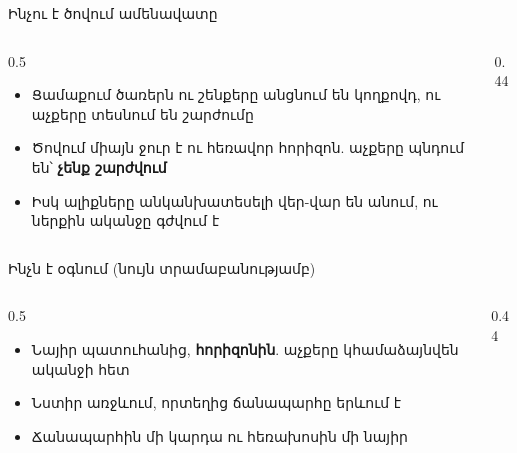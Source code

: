 \begin{frame}{Ինչու է ծովում ամենավատը}
  \begin{columns}[T]
    \begin{column}{0.5\textwidth}
      \begin{itemize}
        \item Ցամաքում ծառերն ու շենքերը անցնում են կողքովդ, ու աչքերը տեսնում են շարժումը
        \item Ծովում միայն ջուր է ու հեռավոր հորիզոն. աչքերը պնդում են՝ \textbf{չենք շարժվում}
        \item Իսկ ալիքները անկանխատեսելի վեր-վար են անում, ու ներքին ականջը գժվում է
      \end{itemize}
    \end{column}
    \begin{column}{0.44\textwidth}
    \end{column}
  \end{columns}
\end{frame}

\begin{frame}{Ինչն է օգնում (նույն տրամաբանությամբ)}
  \begin{columns}[T]
    \begin{column}{0.5\textwidth}
      \begin{card}[colback=mint!35!cardwhite]
        \begin{itemize}
          \item Նայիր պատուհանից, \textbf{հորիզոնին}. աչքերը կհամաձայնվեն ականջի հետ
          \item Նստիր առջևում, որտեղից ճանապարհը երևում է
          \item Ճանապարհին մի կարդա ու հեռախոսին մի նայիր
        \end{itemize}
      \end{card}
    \end{column}
    \begin{column}{0.44\textwidth}
    \end{column}
  \end{columns}
\end{frame}

